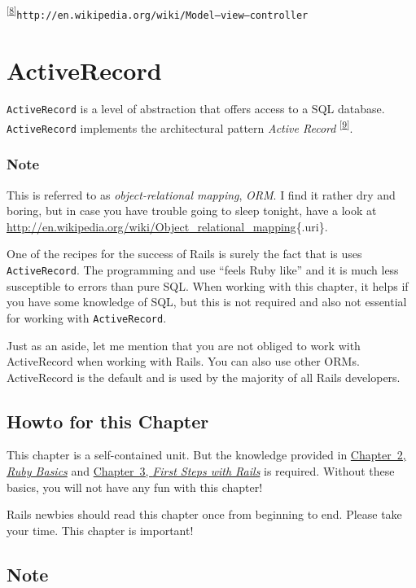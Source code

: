 \documentclass[a4paper]{book}
\newcounter{tab}[chapter]
\newcommand{\chap}[1]{\newpage\thispagestyle{empty}\chapter{#1}\label{chap:\thechapter}}
\begin{document}
\textsuperscript{{[}\hyperref[idp2617376]{8}{]}}\texttt{http://en.wikipedia.org/wiki/Model–view–controller}

\chap{ActiveRecord}\label{activerecord}

\texttt{ActiveRecord} is a level of abstraction that offers access to a SQL database. \texttt{ActiveRecord} implements the architectural pattern \emph{Active Record} \textsuperscript{{[}\hyperref[ftn.idp2940224]{9}{]}}.

\subsection{Note}\label{note-20}

This is referred to as \emph{object-relational mapping}, \emph{ORM}. I find it rather dry and boring, but in case you have trouble going to sleep tonight, have a look at \url{http://en.wikipedia.org/wiki/Object_relational_mapping}\{.uri\}.

One of the recipes for the success of Rails is surely the fact that is uses \texttt{ActiveRecord}. The programming and use “feels Ruby like” and it is much less susceptible to errors than pure SQL. When working with this chapter, it helps if you have some knowledge of SQL, but this is not required and also not essential for working with \texttt{ActiveRecord}.

Just as an aside, let me mention that you are not obliged to work with ActiveRecord when working with Rails. You can also use other ORMs. ActiveRecord is the default and is used by the majority of all Rails developers.

\section{Howto for this Chapter}\label{howto-for-this-chapter}

This chapter is a self-contained unit. But the knowledge provided in \hyperref[ruby-grundlagen]{Chapter~2, \emph{Ruby Basics}} and \hyperref[ersteux5fschritteux5fmitux5frails]{Chapter~3, \emph{First Steps with Rails}} is required. Without these basics, you will not have any fun with this chapter!

Rails newbies should read this chapter once from beginning to end. Please take your time. This chapter is important!

\section{Note}\label{note-21}
\end{document}
